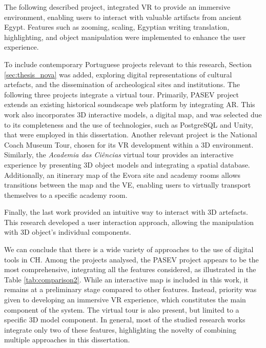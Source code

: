 The following described project, integrated \gls{VR} to provide an immersive environment, enabling users to interact with valuable artifacts from ancient Egypt. Features such as zooming, scaling, Egyptian writing translation, highlighting, and object manipulation were implemented to enhance the user experience.

To include contemporary Portuguese projects relevant to this research, Section \ref{sec:thesis_nova} was added, exploring digital representations of cultural artefacts, and the dissemination of archeological sites and institutions.
The following three projects integrate a virtual tour. Primarily, \gls{PASEV} project extends an existing historical soundscape web platform by integrating \gls{AR}. This work also incorporates 3D interactive models, a digital map, and was selected due to its completeness and the use of technologies, such as PostgreSQL and Unity, that were employed in this dissertation. 
Another relevant project is the National Coach Museum Tour, chosen for its \gls{VR} development within a 3D environment.
Similarly, the \textit{Academia das Ciências} virtual tour provides an interactive experience by presenting \gls{3D} object models and integrating a spatial database. Additionally, an itinerary map of the Evora site and academy rooms allows transitions between the map and the \gls{VE}, enabling users to virtually transport themselves to a specific academy room.

Finally, the last work provided an intuitive way to interact with \gls{3D} artefacts. This research developed a user interaction approach, allowing the manipulation with \gls{3D} object's individual components.

We can conclude that there is a wide variety of approaches to the use of digital tools in \gls{CH}. Among the projects analysed, the PASEV project appears to be the most comprehensive, integrating all the features considered, as illustrated in the Table \ref{tab:comparison2}.
While an interactive map is included in this work, it remains at a preliminary stage compared to other features. 
Instead, priority was given to developing an immersive \gls{VR} experience, which constitutes the main component of the system. The virtual tour is also present, but limited to a specific \gls{3D} model component. 
In general, most of the studied research works integrate only two of these features, highlighting the novelty of combining multiple approaches in this dissertation.

\newcommand{\cmark}{\ding{51}} %
\newcommand{\xmark}{\ding{55}} %

